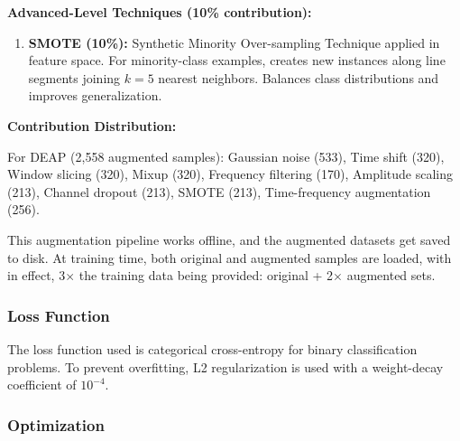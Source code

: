 \documentclass[conference]{IEEEtran}
\begin{document}
\textbf{Advanced-Level Techniques (10\% contribution):}

\begin{enumerate}
    \item \textbf{SMOTE (10\%):}  Synthetic Minority Over-sampling Technique applied in feature space. For minority-class examples, creates new instances along line segments joining $k = 5$ nearest neighbors. Balances class distributions and improves generalization.
\end{enumerate}

\textbf{Contribution Distribution:}

For DEAP (2,558 augmented samples): Gaussian noise (533), Time shift (320), Window slicing (320), Mixup (320), Frequency filtering (170), Amplitude scaling (213), Channel dropout (213), SMOTE (213), Time-frequency augmentation (256).

This augmentation pipeline works offline, and the augmented datasets get saved to disk. At training time, both original and augmented samples are loaded, with in effect, 3$\times$ the training data being provided: original + 2$\times$ augmented sets.

\subsubsection{Loss Function}

The loss function used is categorical cross-entropy for binary classification problems. To prevent overfitting, L2 regularization is used with a weight-decay coefficient of  $10^{-4}$.

\subsubsection{Optimization}
\end{document}
